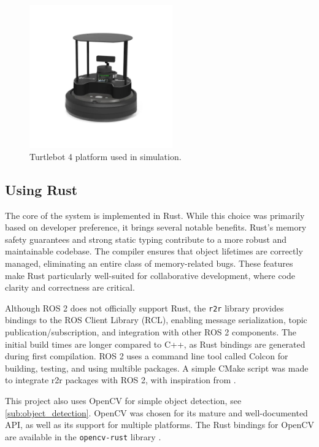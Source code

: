 \begin{figure}[H]
    \begin{center}
        \includegraphics[width=0.55\textwidth]{figures/tb4.png}
    \end{center}
    \caption{Turtlebot 4 platform used in simulation.}
    \label{fig:tb4}
\end{figure}

\subsection{Using Rust}
The core of the system is implemented in Rust. While this choice was primarily based on developer preference, it brings several notable benefits. 
Rust's memory safety guarantees and strong static typing contribute to a more robust and maintainable codebase. The compiler ensures that object lifetimes are correctly managed, eliminating an entire class of memory-related bugs. These features make Rust particularly well-suited for collaborative development, where code clarity and correctness are critical.

Although ROS 2 does not officially support Rust, the \texttt{r2r} library \cite{r2r} provides bindings to the ROS Client Library (RCL), enabling message serialization, topic publication/subscription, and integration with other ROS 2 components. The initial build times are longer compared to C++, as Rust bindings are generated during first compilation. ROS 2 uses a command line tool called Colcon \cite{colcon} for building, testing, and using multible packages. A simple CMake script was made to integrate r2r packages with ROS 2, with inspiration from \cite{r2r-minimal-node}.

This project also uses OpenCV for simple object detection, see \cref{sub:object_detection}. OpenCV was chosen for its mature and well-documented API, as well as its support for multiple platforms. The Rust bindings for OpenCV are available in the \texttt{opencv-rust} library \cite{opencv-rust}.


